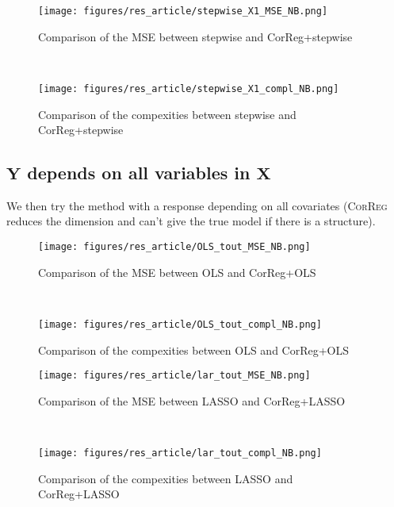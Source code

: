 \documentclass[12pt,a4paper]{report}
\begin{document}
 \begin{figure}[h!]
	\begin{minipage}[l]{.48\linewidth}
			\texttt{[image: figures/res\_article/stepwise\_X1\_MSE\_NB.png]} 
			\caption{Comparison of the MSE between stepwise and CorReg+stepwise}
	\end{minipage} \
   \begin{minipage}[r]{.48\linewidth}
			\texttt{[image: figures/res\_article/stepwise\_X1\_compl\_NB.png]} 
			\caption{Comparison of the compexities between stepwise and CorReg+stepwise} 
   \end{minipage}
\end{figure}

\clearpage
	\subsection{$\boldsymbol{Y}$ depends on all variables in $\boldsymbol{X}$}	 	
We then try the method with a response depending on all covariates (\textsc{CorReg} reduces the dimension and can't give the true model if there is a structure). %
 
 
 \begin{figure}[h!]
	\begin{minipage}[l]{.48\linewidth}
			\texttt{[image: figures/res\_article/OLS\_tout\_MSE\_NB.png]} 
			\caption{Comparison of the MSE between OLS and CorReg+OLS}
	\end{minipage} \
   \begin{minipage}[r]{.48\linewidth}
			\texttt{[image: figures/res\_article/OLS\_tout\_compl\_NB.png]} 
			\caption{Comparison of the compexities between OLS and CorReg+OLS} 
   \end{minipage}
\end{figure}
 

 \begin{figure}[h!]
	\begin{minipage}[l]{.48\linewidth}
			\texttt{[image: figures/res\_article/lar\_tout\_MSE\_NB.png]} 
			\caption{Comparison of the MSE between LASSO and CorReg+LASSO}
	\end{minipage} \
   \begin{minipage}[r]{.48\linewidth}
			\texttt{[image: figures/res\_article/lar\_tout\_compl\_NB.png]} 
			\caption{Comparison of the compexities between LASSO and CorReg+LASSO} 
   \end{minipage}
\end{figure}
\end{document}
